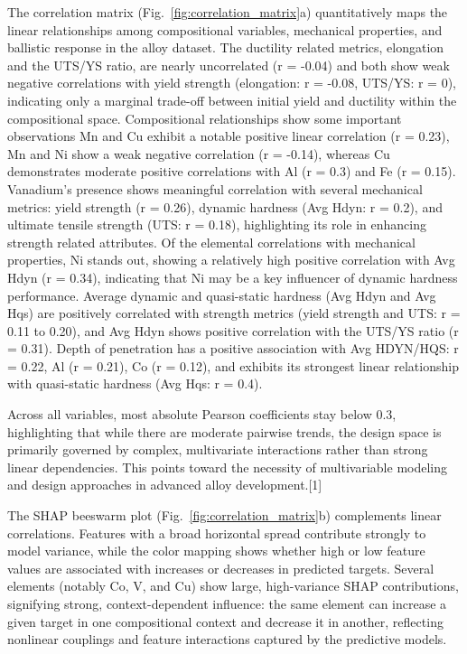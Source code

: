 \documentclass[letterpaper,4pt,times,preprint]{elsarticle}
\begin{document}
The correlation matrix (Fig.~\ref{fig:correlation_matrix}a) quantitatively maps the linear relationships among compositional variables, mechanical properties, and ballistic response in the alloy dataset. The ductility related metrics, elongation and the UTS/YS ratio, are nearly uncorrelated (r = -0.04) and both show weak negative correlations with yield strength (elongation: r = -0.08, UTS/YS: r = 0), indicating only a marginal trade-off between initial yield and ductility within the compositional space. Compositional relationships show some important observations Mn and Cu exhibit a notable positive linear correlation (r = 0.23), Mn and Ni show a weak negative correlation (r = -0.14), whereas Cu demonstrates moderate positive correlations with Al (r = 0.3) and Fe (r = 0.15). Vanadium’s presence shows meaningful correlation with several mechanical metrics: yield strength (r = 0.26), dynamic hardness (Avg Hdyn: r = 0.2), and ultimate tensile strength (UTS: r = 0.18), highlighting its role in enhancing strength related attributes. Of the elemental correlations with mechanical properties, Ni stands out, showing a relatively high positive correlation with Avg Hdyn (r = 0.34), indicating that Ni may be a key influencer of dynamic hardness performance. Average dynamic and quasi-static hardness (Avg Hdyn and Avg Hqs) are positively correlated with strength metrics (yield strength and UTS: r = 0.11 to 0.20), and Avg Hdyn shows positive correlation with the UTS/YS ratio (r = 0.31). Depth of penetration has a positive association with Avg HDYN/HQS: r = 0.22, Al (r = 0.21), Co (r = 0.12), and exhibits its strongest linear relationship with quasi-static hardness (Avg Hqs: r = 0.4).


Across all variables, most absolute Pearson coefficients stay below 0.3, highlighting that while there are moderate pairwise trends, the design space is primarily governed by complex, multivariate interactions rather than strong linear dependencies. This points toward the necessity of multivariable modeling and design approaches in advanced alloy development.[1]


The SHAP beeswarm plot (Fig.~\ref{fig:correlation_matrix}b) complements linear correlations. Features with a broad horizontal spread contribute strongly to model variance, while the color mapping shows whether high or low feature values are associated with increases or decreases in predicted targets. Several elements (notably Co, V, and Cu) show large, high-variance SHAP contributions, signifying strong, context-dependent influence: the same element can increase a given target in one compositional context and decrease it in another, reflecting nonlinear couplings and feature interactions captured by the predictive models.
\end{document}
